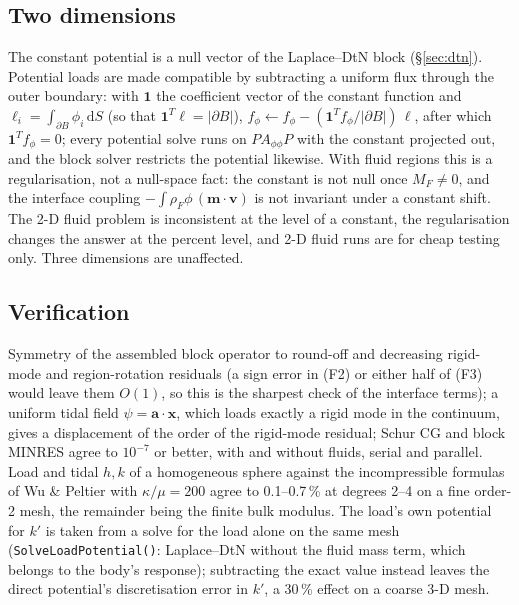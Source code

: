 \documentclass[11pt]{article}
\numberwithin{equation}{section}
\theoremstyle{remark}
\newcommand{\dS}{\,\mathrm{d}S}
\newcommand{\vv}{\mathbf{v}}
\newcommand{\vm}{\mathbf{m}}
\newcommand{\vx}{\mathbf{x}}
\newcommand{\code}[1]{\texttt{#1}}
\begin{document}
\subsection{Two dimensions}
\label{sec:mixed-2d}

The constant potential is a null vector of the Laplace--DtN block
(\S\ref{sec:dtn}). Potential loads are made compatible by subtracting a
uniform flux through the outer boundary: with $\mathbf{1}$ the coefficient
vector of the constant function and $\ell_i = \int_{\partial B}\phi_i\dS$
(so that $\mathbf{1}^T\ell = |\partial B|$), $f_\phi\leftarrow f_\phi -
(\mathbf{1}^Tf_\phi/|\partial B|)\,\ell$, after which
$\mathbf{1}^Tf_\phi = 0$; every potential solve runs on $PA_{\phi\phi}P$ with
the constant projected out, and the block solver restricts the potential
likewise. With fluid regions this is a regularisation, not a null-space
fact: the constant is not null once $M_F\neq0$, and the interface coupling
$-\int\rho_F\phi\,(\vm\cdot\vv)$ is not invariant under a constant shift.
The 2-D fluid problem is inconsistent at the level of a constant, the
regularisation changes the answer at the percent level, and 2-D fluid runs
are for cheap testing only. Three dimensions are unaffected.

\subsection{Verification}

Symmetry of the assembled block operator to round-off and decreasing
rigid-mode and region-rotation residuals (a sign error in (F2) or either
half of (F3) would leave them $O(1)$, so this is the sharpest check of the
interface terms); a uniform tidal field $\psi = \mathbf{a}\cdot\vx$, which
loads exactly a rigid mode in the continuum, gives a displacement of the
order of the rigid-mode residual; Schur CG and block MINRES agree to
$10^{-7}$ or better, with and without fluids, serial and parallel. Load
and tidal $h, k$ of a homogeneous sphere against the incompressible
formulas of Wu \& Peltier \cite{WuPeltier1982} with $\kappa/\mu = 200$
agree to 0.1--0.7\,\% at degrees 2--4 on a fine order-2 mesh, the
remainder being the finite bulk modulus. The load's own potential for
$k'$ is taken from a solve for the load alone on the same mesh
(\code{SolveLoadPotential()}: Laplace--DtN without the fluid mass term,
which belongs to the body's response); subtracting the exact value instead
leaves the direct potential's discretisation error in $k'$, a 30\,\% effect
on a coarse 3-D mesh.
\end{document}
